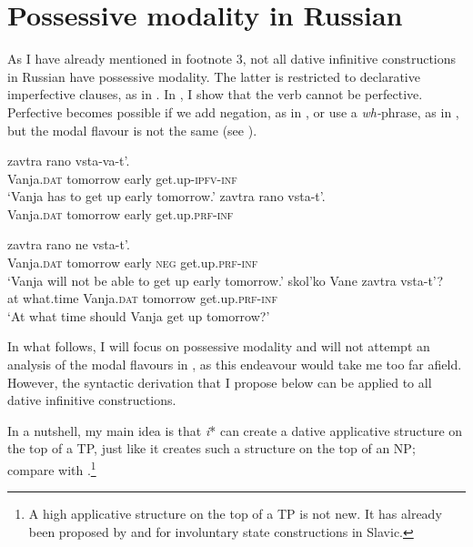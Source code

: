 \documentclass[output=paper,colorlinks,citecolor=brown,modfonts,nonflat]{langsci/langscibook}
\begin{document}
\section{Possessive modality in Russian}\label{sec:tsedryk:4}

As I have already mentioned in footnote 3, not all dative infinitive constructions in Russian have possessive modality. The latter is restricted to declarative imperfective clauses, as in . In , I show that the verb cannot be perfective. Perfective becomes possible if we add negation, as in , or use a \textit{wh-}phrase, as in , but the modal flavour is not the same (see \citealt{Fortuin2007, Tsedryk2018}).

\ea%
    \label{ex:tsedryk:29}
    \ea\label{ex:tsedryk:29a}
              {zavtra}       {rano}   {vsta-va-t’}.\\
            Vanja.\textsc{dat}  tomorrow  early  get.up-\textsc{ipfv-inf}\\
    \glt    ‘Vanja has to get up early tomorrow.’
    \ex\label{ex:tsedryk:29b}
              {zavtra}       {rano}   {vsta-t’}.\\
            Vanja.\textsc{dat}  tomorrow  early  get.up.\textsc{prf-inf}\\
    \z
\z

\ea%
    \label{ex:tsedryk:30}
    \ea\label{ex:tsedryk:30a}
             {zavtra}       {rano}   {ne}     {vsta-t’}.\\
            Vanja.\textsc{dat}  tomorrow  early  \textsc{neg}    get.up.\textsc{prf-inf}\\
    \glt    ‘Vanja will not be able to get up early tomorrow.’
    \ex\label{ex:tsedryk:30b}
        {skol’ko}       {Vane}           {zavtra}         {vsta-t’}?\\
            at    what.time    Vanja.\textsc{dat}  tomorrow    get.up.\textsc{prf-inf}\\
    \glt    ‘At what time should Vanja get up tomorrow?’
    \z
\z

In what follows, I will focus on possessive modality and will not attempt an analysis of the modal flavours in , as this endeavour would take me too far afield. However, the syntactic derivation that I propose below can be applied to all dative infinitive constructions.  

In a nutshell, my main idea is that \textit{i}* can create a dative applicative structure on the top of a TP, just like it creates such a structure on the top of an NP; compare  with .\footnote{A high applicative structure on the top of a TP is not new. It has already been proposed by \citet{Rivero2009} and \citet{RiveroArregui2012} for involuntary state constructions in Slavic.}      
\end{document}
